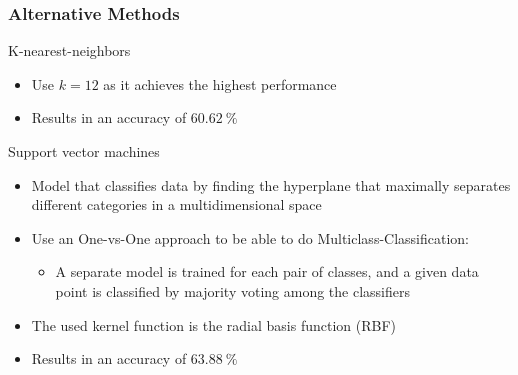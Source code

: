 \documentclass[8pt]{beamer}
\begin{document}
\begin{frame}
{\begin{figure}
\begin{minipage}[b]{0.48\textwidth}
        \end{minipage}
    \end{figure}
}
\end{frame}

\begin{frame}
\frametitle{Alternative Methods}
  \begin{alertblock}{K-nearest-neighbors}
    \begin{itemize}
     \item Use $k=12$ as it achieves the highest performance
     \item Results in an \alert{accuracy} of $\SI{60.62}{\percent}$
    \end{itemize}
  \end{alertblock}
  \begin{alertblock}{Support vector machines}
    \begin{itemize}
    \item{Model that classifies data by finding the hyperplane that maximally separates different categories in a multidimensional space}
    \item Use an One-vs-One approach to be able to do Multiclass-Classification:
    \begin{itemize}
      \item A separate model is trained for each pair of classes, and a given data point is classified by majority voting among the classifiers
      \end{itemize}
    \item The used kernel function is the radial basis function (RBF)
    \item Results in an \alert{accuracy} of $\SI{63.88}{\percent}$
    \end{itemize}
  \end{alertblock}
\end{frame}
\end{document}
